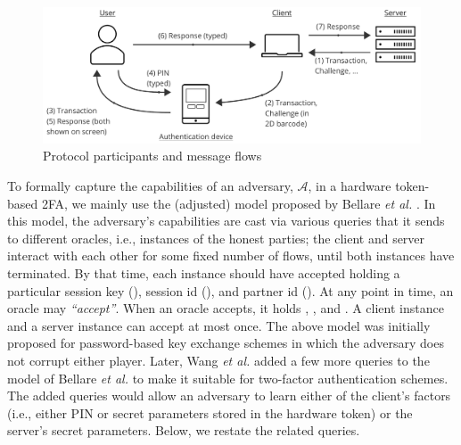 \begin{figure}
\begin{centering}
\includegraphics[width=12cm]{setup}
\end{centering}
\caption{\label{fig:setup}Protocol participants and message flows}
\end{figure}

%
To formally capture the capabilities of an adversary, $\mathcal{A}$, in a hardware token-based 2FA,  we mainly use the (adjusted) model proposed by Bellare \textit{et al.} \cite{BellarePR00}. In this model, the adversary’s capabilities are cast via various queries that it sends to different oracles, i.e., instances of the honest parties; the client and server interact with each other for some fixed number of flows, until both instances have terminated. By that time, each instance should have accepted holding a particular session key (\seckey), session id (\SID), and partner id (\PID). At any point in time, an oracle may \emph{``accept''}. When an oracle accepts, it holds \seckey, \SID, and \PID. A client instance and a server instance can accept at most once. The above model was initially proposed for password-based key exchange schemes in which the adversary does not corrupt either player.  Later, Wang \textit{et al.} \cite{WangW18}  added a few more queries to the model of  Bellare \textit{et al.} to make it suitable for two-factor authentication schemes. The added queries would allow an adversary to learn either of the client's factors (i.e., either PIN or secret parameters stored in the hardware token) or the server's secret parameters.  Below, we restate the related queries. 
 





